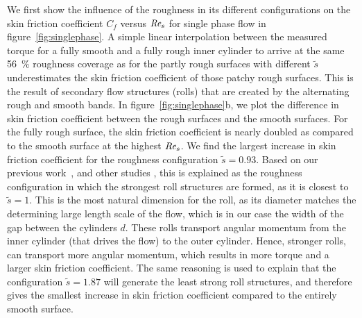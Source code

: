 \documentclass[aps,twocolumn,10pt,floatfix, superscriptaddress,longbibliography,pra]{revtex4-1}
\newcommand\Rey{\mbox{\textit{Re$_s$}}}  %
\newcommand{\perc}[1]{ \SI{#1}{\percent} }
\begin{document}
We first show the influence of the roughness in its different configurations on the skin friction coefficient $C_f$ versus $\Rey$ for single phase flow in figure~\ref{fig:singlephase}. A simple linear interpolation between the measured torque for a fully smooth and a fully rough inner cylinder to arrive at the same \perc{56} roughness coverage as for the partly rough surfaces with different $\tilde{s}$ underestimates the skin friction coefficient of those patchy rough surfaces. This is the result of secondary flow structures (rolls) that are created by the alternating rough and smooth bands. In figure~\ref{fig:singlephase}b, we plot the difference in skin friction coefficient between the rough surfaces and the smooth surfaces. For the fully rough surface, the skin friction coefficient is nearly doubled as compared to the smooth surface at the highest $\Rey$. We find the largest increase in skin friction coefficient for the roughness configuration $\tilde{s} = 0.93$. Based on our previous work~\citep{Bakhuis2019}, and other studies \citep{Chung2018}, this is explained as the roughness configuration in which the strongest roll structures are formed, as it is closest to $\tilde{s} = 1$. This is the most natural dimension for the roll, as its diameter matches the determining large length scale of the flow, which is in our case the width of the gap between the cylinders $d$. These rolls transport angular momentum from the inner cylinder (that drives the flow) to the outer cylinder. Hence, stronger rolls, can transport more angular momentum, which results in more torque and a larger skin friction coefficient. The same reasoning is used to explain that the configuration $\tilde{s} = 1.87$ will generate the least strong roll structures, and therefore gives the smallest increase in skin friction coefficient compared to the entirely smooth surface.
\end{document}

